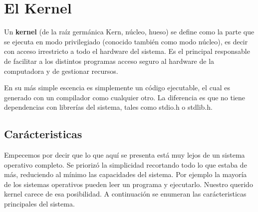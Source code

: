 \def\kernel{\textbf{kernel} }
\def\SO{\textbf{kernel} }
\chapter{El Kernel}

Un \kernel (de la raíz germánica Kern, núcleo, hueso) se define como la parte que se ejecuta en modo privilegiado (conocido también como modo núcleo), es decir con acceso irrestricto a todo el hardware del sistema. Es el principal responsable de facilitar a los distintos programas acceso seguro al hardware de la computadora y de  gestionar recursos.

En su más simple escencia es simplemente un código ejecutable, el cual es generado con un compilador como cualquier otro. La diferencia es que no tiene dependencias con librerías del sistema, tales como stdio.h o stdlib.h.

\section{Carácteristicas}
Empecemos por decir que lo que aquí se presenta está muy lejos de un sistema operativo completo. Se priorizó la simplicidad recortando todo lo que estaba de más, reduciendo al mínimo las capacidades del sistema. Por ejemplo la mayoría de los sistemas operativos pueden leer un programa y ejecutarlo. Nuestro querido kernel carece de esa posibilidad. A continuación se enumeran las carácteristicas principales del sistema.

